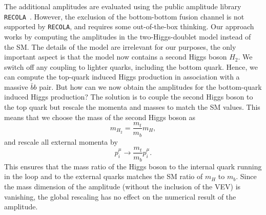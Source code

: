 The additional amplitudes are evaluated using the public amplitude library \texttt{RECOLA}~\cite{Actis:2016mpe}. However, the exclusion of the bottom-bottom fusion channel is not supported by \texttt{RECOLA}, and requires some out-of-the-box thinking. Our approach works by computing the amplitudes in the two-Higgs-doublet model instead of the \acs{SM}. The details of the model are irrelevant for our purposes, the only important aspect is that the model now contains a second Higgs boson $H_2$. We switch off any coupling to lighter quarks, including the bottom quark. Hence, we can compute the top-quark induced Higgs production in association with a massive $\bar{b} b$ pair. But how can we now obtain the amplitudes for the bottom-quark induced Higgs production? The solution is to couple the second Higgs boson to the top quark but rescale the momenta and masses to match the \acs{SM} values. This means that we choose the mass of the second Higgs boson as
\begin{equation}
m_{H_2} = \frac{m_t}{m_b} m_H,
\end{equation}
and rescale all external momenta by
\begin{equation}
p_i^\mu \rightarrow \frac{m_t}{m_b} p_i^\mu.
\end{equation}
This ensures that the mass ratio of the Higgs boson to the internal quark running in the loop and to the external quarks matches the \acs{SM} ratio of $m_H$ to $m_b$. Since the mass dimension of the amplitude (without the inclusion of the \acs{VEV}) is vanishing, the global rescaling has no effect on the numerical result of the amplitude.

